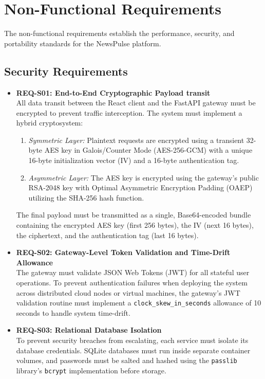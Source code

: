 \section{Non-Functional Requirements}
The non-functional requirements establish the performance, security, and portability standards for the NewsPulse platform.

\subsection{Security Requirements}
\begin{itemize}
    \item \textbf{REQ-S01: End-to-End Cryptographic Payload transit} \\
    All data transit between the React client and the FastAPI gateway must be encrypted to prevent traffic interception. The system must implement a hybrid cryptosystem:
    \begin{enumerate}
        \item \textit{Symmetric Layer:} Plaintext requests are encrypted using a transient 32-byte AES key in Galois/Counter Mode (AES-256-GCM) with a unique 16-byte initialization vector (IV) and a 16-byte authentication tag.
        \item \textit{Asymmetric Layer:} The AES key is encrypted using the gateway's public RSA-2048 key with Optimal Asymmetric Encryption Padding (OAEP) utilizing the SHA-256 hash function.
    \end{enumerate}
    The final payload must be transmitted as a single, Base64-encoded bundle containing the encrypted AES key (first 256 bytes), the IV (next 16 bytes), the ciphertext, and the authentication tag (last 16 bytes).
    \item \textbf{REQ-S02: Gateway-Level Token Validation and Time-Drift Allowance} \\
    The gateway must validate JSON Web Tokens (JWT) for all stateful user operations. To prevent authentication failures when deploying the system across distributed cloud nodes or virtual machines, the gateway's JWT validation routine must implement a \texttt{clock\_skew\_in\_seconds} allowance of 10 seconds to handle system time-drift.
    \item \textbf{REQ-S03: Relational Database Isolation} \\
    To prevent security breaches from escalating, each service must isolate its database credentials. SQLite databases must run inside separate container volumes, and passwords must be salted and hashed using the \texttt{passlib} library's \texttt{bcrypt} implementation before storage.
\end{itemize}

